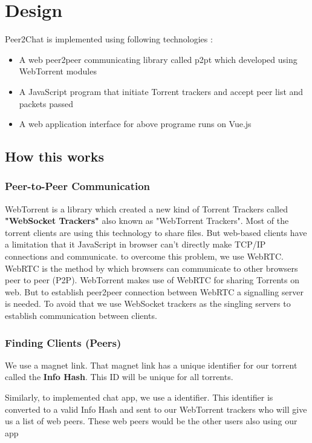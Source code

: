 \documentclass{fisatproject}
\begin{document}
\section{Design}

Peer2Chat is implemented using following technologies : 
  \begin{itemize}
 \item A web peer2peer communicating library called p2pt which developed using WebTorrent modules 
 \item A JavaScript program that initiate Torrent trackers and accept peer list and packets passed
 \item A web application interface for above programe runs on Vue.js 
 \end{itemize}

   \subsection{How this works}
   
    	\subsubsection{Peer-to-Peer Communication}
   WebTorrent is a library which created a new kind of Torrent Trackers called \textbf{"WebSocket Trackers"}  also known as "WebTorrent Trackers". Most of the torrent clients are using this technology to share files. But web-based  clients have a limitation that it  JavaScript in browser can't directly make TCP/IP connections and communicate. to overcome this problem, we use WebRTC. WebRTC is the method by which browsers can communicate to other browsers peer to peer (P2P). WebTorrent makes use of WebRTC for sharing Torrents on web. But to establish peer2peer connection between WebRTC a signalling server is needed. To avoid that we use WebSocket trackers as the singling servers to establish communication between clients.  
   		\subsubsection{Finding Clients (Peers)}
   		We use a magnet link. That magnet link has a unique identifier for our torrent called the \textbf{Info Hash}. This ID will be unique for all torrents.
   		
   		Similarly, to implemented chat app, we use a identifier. This identifier is converted to a valid Info Hash and sent to our WebTorrent trackers who will give us a list of web peers. These web peers would be the other users also using our app
\end{document}
